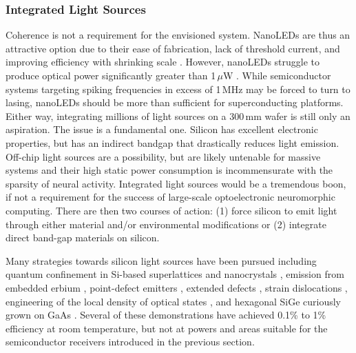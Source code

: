 \documentclass[twocolumn]{article}
\begin{document}
\subsubsection{Integrated Light Sources}
Coherence is not a requirement for the envisioned system. NanoLEDs are thus an attractive option due to their ease of fabrication, lack of threshold current, and improving efficiency with shrinking scale \cite{romeira2019physical}. However, nanoLEDs struggle to produce optical power significantly greater than 1\,$\mu$W \cite{romeira2019physical}. While semiconductor systems targeting spiking frequencies in excess of 1\,MHz may be forced to turn to lasing, nanoLEDs should be more than sufficient for superconducting platforms. Either way, integrating millions of light sources on a 300\,mm wafer is still only an aspiration. The issue is a fundamental one. Silicon has excellent electronic properties, but has an indirect bandgap that drastically reduces light emission. Off-chip light sources are a possibility, but are likely untenable for massive systems and their high static power consumption is incommensurate with the sparsity of neural activity. Integrated light sources would be a tremendous boon, if not a requirement for the success of large-scale optoelectronic neuromorphic computing. There are then two courses of action: (1) force silicon to emit light through either material and/or environmental modifications or (2) integrate direct band-gap materials on silicon. 

Many strategies towards silicon light sources have been pursued \cite{iyxi1993,shxu2007} including quantum confinement in Si-based superlattices \cite{wali2008} and nanocrystals \cite{wabo2005}, emission from embedded erbium \cite{enpo1985,paga1996}, point-defect emitters \cite{brha1986,brbr1989,rosh2007b,bata2007}, extended defects \cite{nglo2001,milo2006}, strain dislocations \cite{kvba2004}, engineering of the local density of optical states \cite{grzh2001}, and hexagonal SiGe curiously grown on GaAs \cite{Fadaly2020}. Several of these demonstrations have achieved 0.1\% \cite{kvba2004} to 1\% \cite{grzh2001} efficiency at room temperature, but not at powers and areas suitable for the semiconductor receivers introduced in the previous section.
\end{document}
